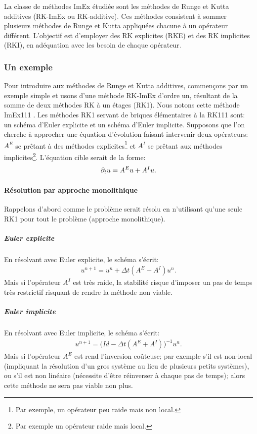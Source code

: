 La classe de méthodes ImEx étudiée sont les méthodes de Runge et Kutta additives (RK-ImEx ou RK-additive).
Ces méthodes consistent à sommer plusieurs méthodes de Runge et Kutta appliquées chacune à un opérateur différent.
L'objectif est d'employer des RK explicites (RKE) et des RK implicites (RKI), en adéquation avec les besoin de chaque opérateur.
\subsubsection{Un exemple}
    Pour introduire aux méthodes de Runge et Kutta additives, commençons par un exemple simple et usons d'une méthode RK-ImEx
    d'ordre un, résultant de la somme de deux méthodes RK à un étages (RK1). Nous notons cette méthode ImEx111 \cite{ASCHER1997151}. 
    Les méthodes RK1 servant de briques élémentaires à la RK111 sont: un schéma d'Euler explicite et un schéma d'Euler implicite.
    Supposons que l'on cherche à approcher une équation d'évolution faisant intervenir deux opérateurs: $A^E$ se prêtant à des méthodes explicites\footnote{Par exemple, un opérateur peu raide mais non local.}
    et $A^I$ se prêtant aux méthodes implicites\footnote{Par exemple un opérateur raide mais local.}. L'équation cible serait de la forme: 
    \begin{align}
        \partial_t u = A^E u + A^I u.
    \end{align}
    \paragraph{Résolution par approche monolithique}
        Rappelons d'abord comme le problème serait résolu en n'utilisant qu'une seule RK1 pour tout le problème (approche monolithique).
        \subparagraph{Euler explicite}
            En résolvant avec Euler explicite, le schéma s'écrit: 
            \begin{align}
                u^{n+1} = u^n + \Delta t (A^E + A^I) u^n.
            \end{align}
            Mais si l'opérateur $A^I$ est très raide, la stabilité risque d'imposer un pas de temps très restrictif risquant de rendre la méthode non viable.
        \subparagraph{Euler implicite}
            En résolvant avec Euler implicite, le schéma s'écrit:
            \begin{align}
                u^{n+1} = \bigl(Id - \Delta t (A^E + A^I)\bigr)^{-1} u^n.
            \end{align}
            Mais si l'opérateur $A^E$ est rend l'inversion coûteuse;
            par exemple s'il est non-local (impliquant la résolution d'un gros système au lieu de plusieurs petits systèmes), 
            ou s'il est non linéaire (nécessite d'être réinverser à chaque pas de temps);
            alors cette méthode ne sera pas viable non plus.
